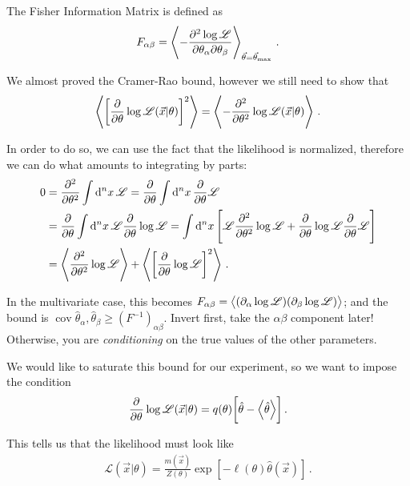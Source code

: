 \documentclass[main.tex]{subfiles}
\begin{document}

The Fisher Information Matrix is defined as 
%
\begin{align}
F_{\alpha \beta } = \expval{- \pdv[2]{\log \mathscr{L}}{\theta _\alpha }{\theta _\beta }}_{\vec{\theta} = \vec{\theta} _{\text{max}}}
\,.
\end{align}

We almost proved the Cramer-Rao bound, however we still need to show that 
%
\begin{align}
\expval{\qty[\pdv{}{\theta } \log \mathscr{L}(\vec{x} | \theta )]^2}
= \expval{- \pdv[2]{}{\theta } \log \mathscr{L}(\vec{x} | \theta )}
\,.
\end{align}

In order to do so, we can use the fact that the likelihood is normalized, therefore we can do what amounts to integrating by parts:
%
\begin{align}
0 &= \pdv[2]{}{\theta } \int \dd[n]{x} \mathscr{L} = \pdv{}{\theta } \int \dd[n]{x} \pdv{}{\theta } \mathscr{L}  \\
&= \pdv{}{\theta } \int \dd[n]{x} \mathscr{L} \pdv{}{\theta } \log \mathscr{L} = \int \dd[n]{x} \qty[\mathscr{L}\pdv[2]{}{\theta } \log \mathscr{L} + \pdv{}{\theta } \log \mathscr{L} \pdv{}{\theta } \mathscr{L}]  \\
&= \expval{\pdv[2]{}{\theta } \log \mathscr{L}} + \expval{\qty[\pdv{}{\theta } \log \mathscr{L}]^2}
\,.
\end{align}

In the multivariate case, this becomes \(F_{\alpha \beta } = \expval{(\partial_{\alpha } \log \mathscr{L}) (\partial_{\beta } \log \mathscr{L})}\); and the bound is \(\operatorname{cov}{\hat{\theta}_\alpha , \hat{\theta}_\beta } \geq (F^{-1})_{\alpha \beta }\). Invert first, take the \(\alpha \beta \) component later! Otherwise, you are \emph{conditioning} on the true values of the other parameters.

We would like to saturate this bound for our experiment, so we want to impose the condition 
%
\begin{align}
\pdv[]{}{\theta } \log \mathscr{L} (\vec{x} | \theta ) = q(\theta ) \qty[\hat{\theta} - \expval{\hat{\theta}}]
\,.
\end{align}

This tells us that the likelihood must look like 
%
\begin{align}
\mathscr{L}(\vec{x} | \theta ) = \frac{m(\vec{x})}{Z(\theta )} \exp[- \ell(\theta ) \hat{\theta}(\vec{x})]
\,.
\end{align}
\end{document}
